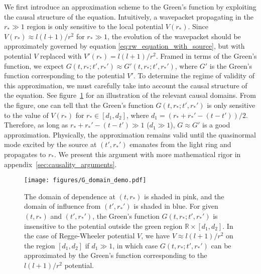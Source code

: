 \documentclass[reprint,aps,physrev,superscriptaddress,10pt,notitlepage,prd,nofootinbib,onecolumn]{revtex4-2}
\newcommand{\fref}[1]{figure~\ref{#1}}
\newcommand{\aref}[1]{appendix~\ref{#1}}
\begin{document}
We first introduce an approximation scheme to the Green's function by exploiting the causal structure of the equation.
Intuitively, a wavepacket propagating in the $r_* \gg 1$ region is only sensitive to the local potential $V(r_*)$.
Since $V(r_*) \approx l(l+1) / r^2$ for $r_* \gg 1$, the evolution of the wavepacket should be approximately governed by equation \eqref{eq:rw_equation_with_source}, but with potential $V$ replaced with $V'(r_*) = l(l+1)/r^2$.
Framed in terms of the Green's function, we expect $G(t,r_*;t',r_*') \approx G'(t,r_*;t',r_*')$, where $G'$ is the Green's function corresponding to the potential $V'$.
To determine the regime of validity of this approximation, we must carefully take into account the causal structure of the equation.
See \fref{fig:green_function_domain_demo} for an illustration of the relevant causal domains.
From the figure, one can tell that the Green's function $G(t,r_*;t',r_*')$ is only sensitive to the value of $V(r_*)$ for $r_* \in [d_1,d_2]$, where $d_1 = (r_*+r_*'-(t-t')) / 2$.
Therefore, as long as $ r_* + r_*' - (t-t') \gg 1$ ($d_1 \gg 1$), $G \approx G'$ is a good approximation.
Physically, the approximation remains valid until the quasinormal mode excited by the source at $(t',r_*')$ emanates from the light ring and propagates to $r_*$.
We present this argument with more mathematical rigor in \aref{sec:causality_arguments}.



\begin{figure}
  \texttt{[image: figures/G\_domain\_demo.pdf]}
  \caption{
    The domain of dependence at $(t,r_*)$ is shaded in pink, and the domain of influence from $(t',r_*')$ is shaded in blue.
    For given $(t,r_*)$ and $(t',r_*')$, the Green's function $G(t,r_*;t',r_*')$ is insensitive to the potential outside the green region $\mathbb{R} \times [d_1, d_2]$.
    In the case of Regge-Wheeler potential $V$, we have $V \approx l(l+1) / r^2$ on the region $[d_1,d_2]$ if $d_1 \gg 1$, in which case $G(t,r_*;t',r_*')$ can be approximated by the Green's function corresponding to the $l(l+1)/r^2$ potential.}
  \label{fig:green_function_domain_demo}
\end{figure}
\end{document}

